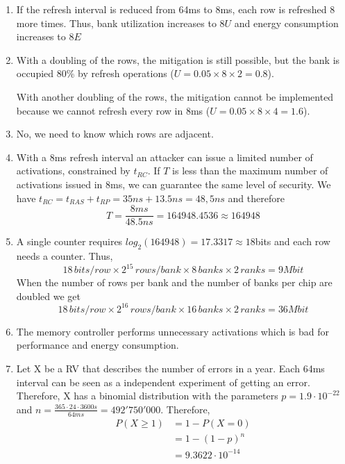 \documentclass[a4paper]{article}
\begin{document}
\begin{enumerate}[label=\alph*)]
    \item If the refresh interval is reduced from 64ms to 8ms, each row is refreshed 8 more times.
        Thus, bank utilization increases to $8U$ and energy consumption increases to $8E$

    \item With a doubling of the rows, the mitigation is still possible, but the bank is occupied 80\%
        by refresh operations ($U = 0.05 \times 8 \times 2 = 0.8$).

        With another doubling of the rows, the mitigation cannot be implemented because we cannot refresh every
        row in 8ms ($U = 0.05 \times 8 \times 4 = 1.6$).

    \item No, we need to know which rows are adjacent.

    \item With a 8ms refresh interval an attacker can issue a limited number of activations, constrained
        by $t_{RC}$. If $T$ is less than the maximum number of activations issued in 8ms, we
        can guarantee the same level of security. We have $t_{RC} = t_{RAS} + t_{RP} = 35ns + 13.5 ns = 48,5ns$
        and therefore
        \begin{equation*}
        T = \frac{8ms}{48.5ns} = 164948.4536 \approx 164948
        \end{equation*}

    \item A single counter requires $log_2(164948) = 17.3317 \approx 18$bits and each row needs a counter.
        Thus,
        \begin{equation*}
            18 \, bits/row \times 2^{15} \, rows/bank \times 8 \, banks \times 2 \, ranks = 9Mbit
        \end{equation*}
        When the number of rows per bank and the number of banks per chip are doubled we get
        \begin{equation*}
            18 \, bits/row \times 2^{16} \, rows/bank \times 16 \, banks \times 2 \, ranks = 36Mbit
        \end{equation*}

    \item The memory controller performs unnecessary activations which is bad for performance and
        energy consumption.

    \item Let X be a RV that describes the number of errors in a year. Each 64ms interval can be seen
        as a independent experiment of getting an error. Therefore, X has a binomial distribution with
        the parameters $p=1.9\cdot10^{-22}$ and  $n=\frac{365 \cdot 24 \cdot 3600s}{64ms} = 492'750'000$.
        Therefore,
        \begin{align*}
            P(X\geq1) &= 1 - P(X=0) \\
                      &= 1 - (1 - p)^n \\
                      &= 9.3622 \cdot 10^{-14}
        \end{align*}

\end{enumerate}
\end{document}
